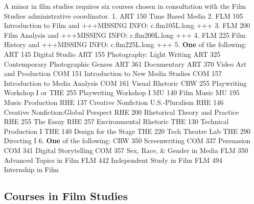 \documentclass[
  letterpaper,
]{scrbook}
\begin{document}
A minor in film studies requires six courses chosen in consultation with
the Film Studies administrative coordinator. 1. ART 150 Time Based Media
2. FLM 105 Introduction to Film and +++MISSING INFO: c.flm105L.long +++
3. FLM 200 Film Analysis and +++MISSING INFO: c.flm200L.long +++ 4. FLM
225 Film History and +++MISSING INFO: c.flm225L.long +++ 5. \textbf{One}
of the following: ART 145 Digital Studio ART 155 Photography: Light
Writing ART 325 Contemporary Photographic Genres ART 361 Documentary ART
370 Video Art and Production COM 151 Introduction to New Media Studies
COM 157 Introduction to Media Analysis COM 161 Visual Rhetoric CRW 255
Playwriting Workshop I or THE 255 Playwriting Workshop I MU 140 Film
Music MU 195 Music Production RHE 137 Creative Nonfiction U.S.-Pluralism
RHE 146 Creative Nonfiction:Global Perspect RHE 200 Rhetorical Theory
and Practice RHE 255 The Essay RHE 257 Environmental Rhetoric THE 130
Technical Production I THE 140 Design for the Stage THE 220 Tech Theatre
Lab THE 290 Directing I 6. \textbf{One} of the following: CRW 350
Screenwriting COM 337 Persuasion COM 341 Digital Storytelling COM 357
Sex, Race, \& Gender in Media FLM 350 Advanced Topics in Film FLM 442
Independent Study in Film FLM 494 Internship in Film

\hypertarget{courses-in-film-studies}{%
\subsection{Courses in Film Studies}\label{courses-in-film-studies}}
\end{document}
